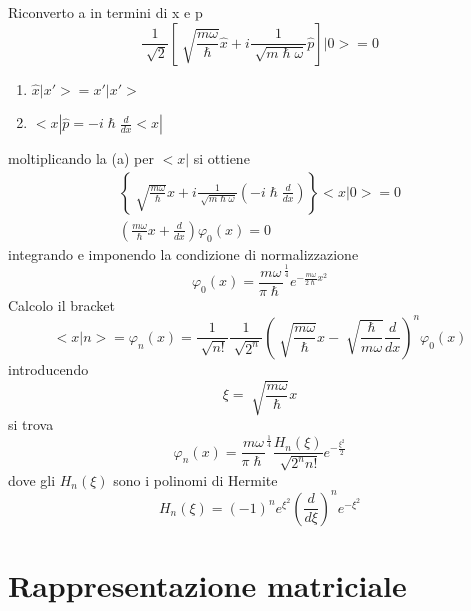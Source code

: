 Riconverto a in termini di x e p
\begin{equation*}
    \frac{1}{\sqrt[]{2}}\left[\sqrt[]{\frac{m\omega}{\hslash}}\hat{x} + i \frac{1}{\sqrt[]{m\hslash\omega}}\hat{p}\right]|0> = 0 \tag{a}
\end{equation*}
\begin{enumerate}
    \item \(\hat{x}|x'> = x'|x'>\)
    \item \(<x|\hat{p} = -i\hslash \frac{d}{dx}<x|\)
\end{enumerate}
moltiplicando la (a) per \(<x|\) si ottiene
\begin{gather*}
    \left\{\sqrt[]{\frac{m\omega}{\hslash}}x + i \frac{1}{\sqrt[]{m\hslash\omega}}\left(-i\hslash\frac{d}{dx}\right)\right\}<x|0> = 0 \\
    \left(\frac{m\omega}{\hslash}x + \frac{d}{dx}\right) \varphi_0(x) = 0 
\end{gather*}
integrando e imponendo la condizione di normalizzazione 
\begin{equation*}
    \varphi_0 (x) = {\frac{m\omega}{\pi\hslash}}^{\frac{1}{4}} e^{-\frac{m\omega}{2\hslash}x^2} \tag{9}
\end{equation*}
Calcolo il bracket 
\begin{equation*}
    <x|n> = \varphi_n(x) = \frac{1}{\sqrt[]{n!}} \frac{1}{\sqrt[]{2^n}} {\left(\sqrt[]{\frac{m\omega}{\hslash}}x - \sqrt[]{\frac{\hslash}{m\omega}}\frac{d}{dx}\right)}^n \varphi_0(x)
\end{equation*}
introducendo
\begin{equation*}
    \xi = \sqrt[]{\frac{m\omega}{\hslash}}x
\end{equation*}
si trova
\begin{equation*}
    \varphi_n (x) = {\frac{m\omega}{\pi\hslash}}^{\frac{1}{4}} \frac{H_n(\xi)}{\sqrt[]{2^nn!}}e^{-\frac{\xi^2}{2}}
\end{equation*}
dove gli \(H_n(\xi)\) sono i polinomi di Hermite
\begin{equation*}
    H_n(\xi) = {(-1)}^n e^{\xi^2}{\left(\frac{d}{d\xi}\right)}^ne^{-\xi^2}
\end{equation*}

\section{Rappresentazione matriciale}

